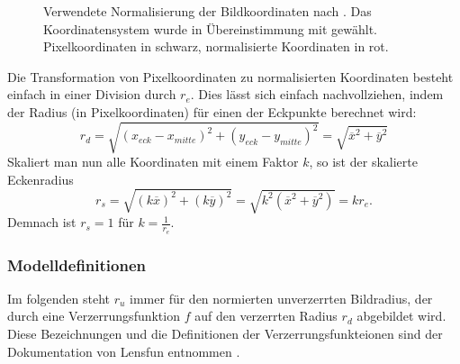 \begin{figure}[h]
	\centering
	
	\caption{Verwendete Normalisierung der Bildkoordinaten nach \cite{imatest, lensfun}. Das Koordinatensystem wurde in Übereinstimmung mit \cite[S. 359]{pbrt_book} gewählt. Pixelkoordinaten in schwarz, normalisierte Koordinaten in rot.	\label{fig:normalisation}}
	\label{fig:norm}
\end{figure}

Die Transformation von Pixelkoordinaten zu normalisierten Koordinaten besteht einfach in einer Division durch $r_e$. Dies lässt sich einfach nachvollziehen, indem der Radius (in Pixelkoordinaten) für einen der Eckpunkte berechnet wird:
\begin{equation}
	r_d = \sqrt{(x_{eck} - x_{mitte})^2 + (y_{eck} - y_{mitte})^2} = \sqrt{\overline{x}^2 + \overline{y}^2}
\end{equation}
Skaliert man nun alle Koordinaten mit einem Faktor $k$, so ist der skalierte Eckenradius
\begin{equation}
	r_s = \sqrt{(k \overline{x})^2 + (k \overline{y})^2} = \sqrt{k^2 (\overline{x}^2 + \overline{y}^2)} = k r_e.
\end{equation}
Demnach ist $r_s = 1$ für $k = \frac{1}{r_e}$.

\subsubsection{Modelldefinitionen}
\label{subsubsec:modeldef}

Im folgenden steht $r_u$ immer für den normierten unverzerrten Bildradius, der durch eine Verzerrungsfunktion $f$ auf den verzerrten Radius $r_d$ abgebildet wird. Diese Bezeichnungen und die Definitionen der Verzerrungsfunkteionen sind der Dokumentation von Lensfun entnommen \cite{lensfun}.


